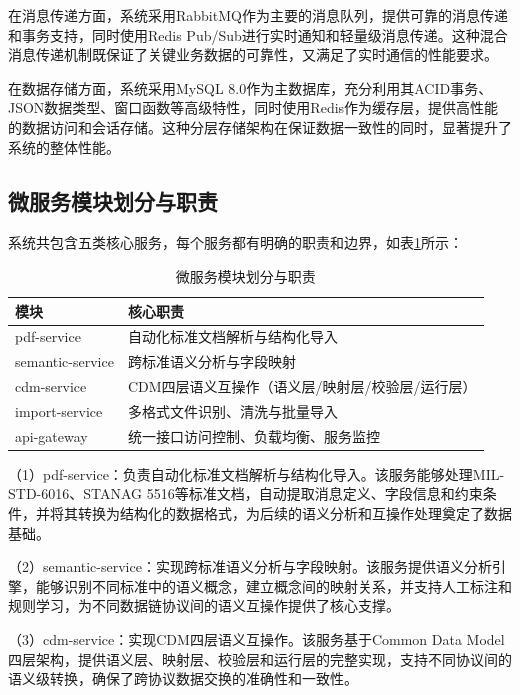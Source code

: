 在消息传递方面，系统采用RabbitMQ作为主要的消息队列，提供可靠的消息传递和事务支持，同时使用Redis Pub/Sub进行实时通知和轻量级消息传递。这种混合消息传递机制既保证了关键业务数据的可靠性，又满足了实时通信的性能要求。

在数据存储方面，系统采用MySQL 8.0作为主数据库，充分利用其ACID事务、JSON数据类型、窗口函数等高级特性，同时使用Redis作为缓存层，提供高性能的数据访问和会话存储。这种分层存储架构在保证数据一致性的同时，显著提升了系统的整体性能。

\subsection{微服务模块划分与职责}

系统共包含五类核心服务，每个服务都有明确的职责和边界，如表\ref{table:microservices}所示：

\begin{table}[H]
    \caption{微服务模块划分与职责}
    \label{table:microservices}
    \centering
    \begin{tabular}{|l|l|}
        \hline
        \textbf{模块} & \textbf{核心职责} \\
        \hline
        pdf-service & 自动化标准文档解析与结构化导入 \\
        semantic-service & 跨标准语义分析与字段映射 \\
        cdm-service & CDM四层语义互操作（语义层/映射层/校验层/运行层） \\
        import-service & 多格式文件识别、清洗与批量导入 \\
        api-gateway & 统一接口访问控制、负载均衡、服务监控 \\
        \hline
    \end{tabular}
\end{table}

（1）pdf-service：负责自动化标准文档解析与结构化导入。该服务能够处理MIL-STD-6016、STANAG 5516等标准文档，自动提取消息定义、字段信息和约束条件，并将其转换为结构化的数据格式，为后续的语义分析和互操作处理奠定了数据基础。

（2）semantic-service：实现跨标准语义分析与字段映射。该服务提供语义分析引擎，能够识别不同标准中的语义概念，建立概念间的映射关系，并支持人工标注和规则学习，为不同数据链协议间的语义互操作提供了核心支撑。

（3）cdm-service：实现CDM四层语义互操作。该服务基于Common Data Model四层架构，提供语义层、映射层、校验层和运行层的完整实现，支持不同协议间的语义级转换，确保了跨协议数据交换的准确性和一致性。

